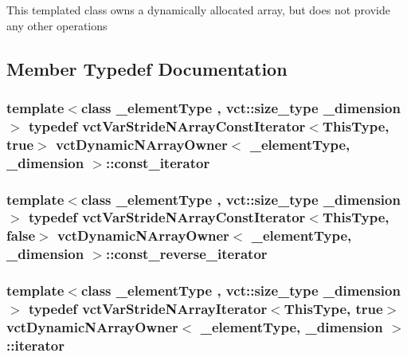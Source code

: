 This templated class owns a dynamically allocated array, but does not provide any other operations 

\subsection{Member Typedef Documentation}
\hypertarget{classvct_dynamic_n_array_owner_a81e092a15fe8a5bf0777a8b1f9cc8e4a}{}
\subsubsection[{const\+\_\+iterator}]{\setlength{\rightskip}{0pt plus 5cm}template$<$class \+\_\+element\+Type , vct\+::size\+\_\+type \+\_\+dimension$>$ typedef {\bf vct\+Var\+Stride\+N\+Array\+Const\+Iterator}$<${\bf This\+Type}, true$>$ {\bf vct\+Dynamic\+N\+Array\+Owner}$<$ \+\_\+element\+Type, \+\_\+dimension $>$\+::{\bf const\+\_\+iterator}}\label{classvct_dynamic_n_array_owner_a81e092a15fe8a5bf0777a8b1f9cc8e4a}
\hypertarget{classvct_dynamic_n_array_owner_a3c8cf0902cf51a404fc00cee4aac3f46}{}
\subsubsection[{const\+\_\+reverse\+\_\+iterator}]{\setlength{\rightskip}{0pt plus 5cm}template$<$class \+\_\+element\+Type , vct\+::size\+\_\+type \+\_\+dimension$>$ typedef {\bf vct\+Var\+Stride\+N\+Array\+Const\+Iterator}$<${\bf This\+Type}, false$>$ {\bf vct\+Dynamic\+N\+Array\+Owner}$<$ \+\_\+element\+Type, \+\_\+dimension $>$\+::{\bf const\+\_\+reverse\+\_\+iterator}}\label{classvct_dynamic_n_array_owner_a3c8cf0902cf51a404fc00cee4aac3f46}
\hypertarget{classvct_dynamic_n_array_owner_a48e740eae5c0a1654e5e93b12d388c19}{}
\subsubsection[{iterator}]{\setlength{\rightskip}{0pt plus 5cm}template$<$class \+\_\+element\+Type , vct\+::size\+\_\+type \+\_\+dimension$>$ typedef {\bf vct\+Var\+Stride\+N\+Array\+Iterator}$<${\bf This\+Type}, true$>$ {\bf vct\+Dynamic\+N\+Array\+Owner}$<$ \+\_\+element\+Type, \+\_\+dimension $>$\+::{\bf iterator}}\label{classvct_dynamic_n_array_owner_a48e740eae5c0a1654e5e93b12d388c19}
\hypertarget{classvct_dynamic_n_array_owner_a9b4b9b8c6f7e3cfe9bdf9aedbdda6f0d}{}
